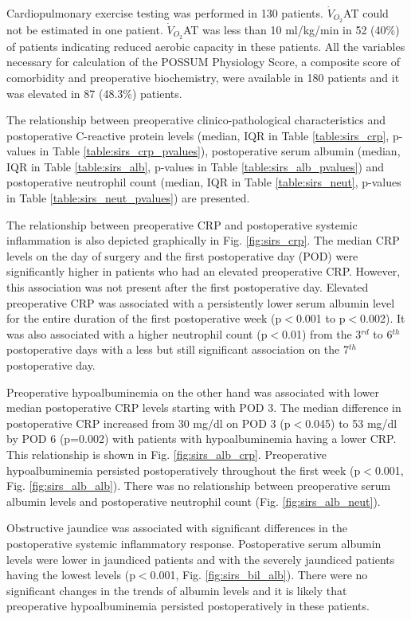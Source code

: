 Cardiopulmonary exercise testing was performed in 130 patients. 
$\dot{V}_{O_2}$AT could not be estimated in one patient.
$\dot{V}_{O_2}$AT was less than 10 ml/kg/min in 52 (40\%) of patients indicating reduced aerobic capacity in these patients.
All the variables necessary for calculation of the POSSUM Physiology Score, a composite score of comorbidity and preoperative biochemistry, were available in 180 patients and it was elevated in 87 (48.3\%) patients.

The relationship between preoperative clinico-pathological characteristics and postoperative C-reactive protein levels (median, IQR in Table \ref{table:sirs_crp}, p-values in Table \ref{table:sirs_crp_pvalues}), postoperative serum albumin (median, IQR in Table \ref{table:sirs_alb}, p-values in Table \ref{table:sirs_alb_pvalues}) and postoperative neutrophil count (median, IQR in Table \ref{table:sirs_neut}, p-values in Table \ref{table:sirs_neut_pvalues}) are presented.

The relationship between preoperative CRP and postoperative systemic inflammation is also depicted graphically in Fig. \ref{fig:sirs_crp}. 
The median CRP levels on the day of surgery and the first postoperative day (POD) were significantly higher in patients who had an elevated preoperative CRP. 
However, this association was not present after the first postoperative day.
Elevated preoperative CRP was associated with a persistently lower serum albumin level for the entire duration of the first postoperative week (p$<$0.001 to p$<$0.002).
It was also associated with a higher neutrophil count (p$<$0.01) from the 3$^{rd}$ to 6$^{th}$ postoperative days with a less but still significant association on the 7$^{th}$ postoperative day. 

Preoperative hypoalbuminemia on the other hand was associated with lower median postoperative CRP levels starting with POD 3. 
The median difference in postoperative CRP increased from 30 mg/dl on POD 3 (p$<$0.045) to 53 mg/dl by POD 6 (p=0.002) with patients with hypoalbuminemia having a lower CRP. 
This relationship is shown in Fig. \ref{fig:sirs_alb_crp}.
Preoperative hypoalbuminemia persisted postoperatively throughout the first week (p$<$0.001, Fig. \ref{fig:sirs_alb_alb}).
There was no relationship between preoperative serum albumin levels and postoperative neutrophil count (Fig. \ref{fig:sirs_alb_neut}).

Obstructive jaundice was associated with significant differences in the postoperative systemic inflammatory response. 
Postoperative serum albumin levels were lower in jaundiced patients and with the severely jaundiced patients having the lowest levels (p$<$0.001, Fig. \ref{fig:sirs_bil_alb}). 
There were no significant changes in the trends of albumin levels and it is likely that preoperative hypoalbuminemia persisted postoperatively in these patients. 

